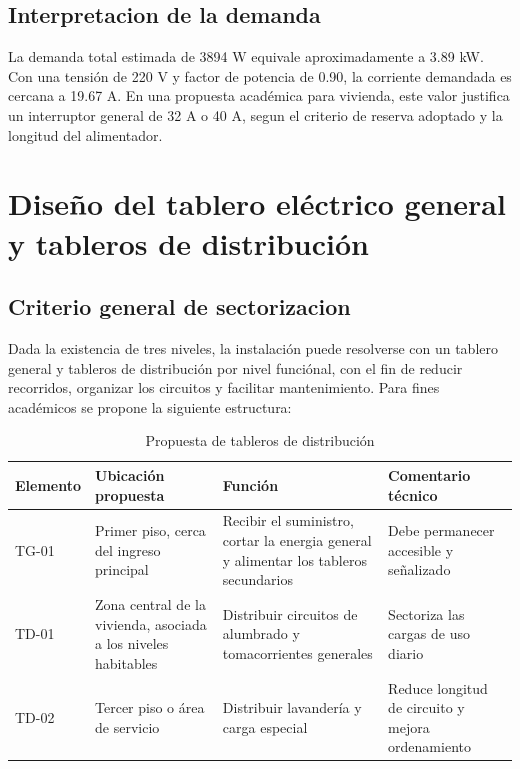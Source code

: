 \subsection{Interpretacion de la demanda}

La demanda total estimada de 3894 W equivale aproximadamente a 3.89 kW. Con una tensión de 220 V y factor de potencia de 0.90, la corriente demandada es cercana a 19.67 A. En una propuesta académica para vivienda, este valor justifica un interruptor general de 32 A o 40 A, segun el criterio de reserva adoptado y la longitud del alimentador.

\section{Diseño del tablero eléctrico general y tableros de distribución}

\subsection{Criterio general de sectorizacion}

Dada la existencia de tres niveles, la instalación puede resolverse con un tablero general y tableros de distribución por nivel funciónal, con el fin de reducir recorridos, organizar los circuitos y facilitar mantenimiento. Para fines académicos se propone la siguiente estructura:

\begin{table}[H]
\centering
\small
\caption{Propuesta de tableros de distribución}
\label{tab:tableros-distribucion}
\begin{tabularx}{\textwidth}{L{2.0cm}L{4.0cm}L{3.6cm}Y}
\toprule
\textbf{Elemento} & \textbf{Ubicación propuesta} & \textbf{Función} & \textbf{Comentario técnico} \\
\midrule
TG-01 & Primer piso, cerca del ingreso principal & Recibir el suministro, cortar la energia general y alimentar los tableros secundarios & Debe permanecer accesible y señalizado \\
TD-01 & Zona central de la vivienda, asociada a los niveles habitables & Distribuir circuitos de alumbrado y tomacorrientes generales & Sectoriza las cargas de uso diario \\
TD-02 & Tercer piso o área de servicio & Distribuir lavandería y carga especial & Reduce longitud de circuito y mejora ordenamiento \\
\bottomrule
\end{tabularx}
\end{table}

